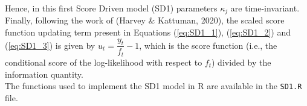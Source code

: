Hence, in this first Score Driven model (SD1) parameters $\kappa_j$ are time-invariant. \\

Finally, following the work of (Harvey \& Kattuman, 2020), the scaled score function updating term present in Equations (\ref{eq:SD1_1}), (\ref{eq:SD1_2}) and (\ref{eq:SD1_3}) is given by $u_t = \dfrac{y_t}{f_t} - 1$, which is the score function (i.e., the conditional score of the log-likelihood with respect to $f_t$) divided by the information quantity. \\

The functions used to implement the SD1 model in R are available in the \texttt{SD1.R} file. 